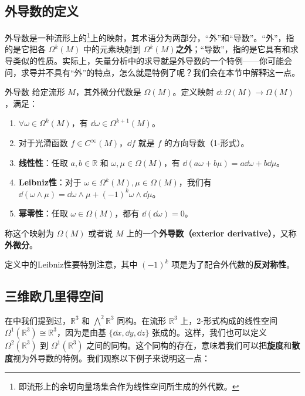

\subsection{外导数的定义}

外导数是一种流形上的\footnote{即流形上的余切向量场集合作为线性空间所生成的外代数。}上的映射，其术语分为两部分，“外”和“导数”。“外”，指的是它把各 $\Omega^k(M)$ 中的元素映射到 $\Omega^k(M)$\textbf{之外}；“导数”，指的是它具有和求导类似的性质。实际上，矢量分析中的求导就是外导数的一个特例——你可能会问，求导并不具有“外”的特点，怎么就是特例了呢？我们会在本节中解释这一点。

\begin{definition}{外导数}\label{def_ExtDer_1}
给定流形 $M$，其外微分代数是 $\Omega (M)$。定义映射 $\dd:\Omega (M)\rightarrow\Omega (M)$，满足：
\begin{enumerate}
\item $\forall \omega\in\Omega^k(M)$，有 $\dd \omega\in\Omega^{k+1}(M)$。
\item 对于光滑函数 $f\in C^\infty(M)$，$\dd f$ 就是 $f$ 的方向导数（1-形式）。
\item \textbf{线性性}：任取 $a, b\in \mathbb{R}$ 和 $\omega, \mu\in\Omega(M)$，有 $\dd(a\omega+b\mu)=a\dd\omega+b\dd\mu$。
\item \textbf{Leibniz性}：对于 $\omega\in\Omega^k(M), \mu\in\Omega(M)$，我们有 $\dd(\omega\wedge\mu)=\dd\omega\wedge\mu+(-1)^k\omega\wedge\dd\mu$。
\item \textbf{幂零性}：任取 $\omega\in\Omega(M)$，都有 $\dd(\dd\omega)=0$。
\end{enumerate}
称这个映射为 $\Omega (M)$ 或者说 $M$ 上的一个\textbf{外导数（exterior derivative）}，又称\textbf{外微分}。
\end{definition}

定义中的Leibniz性要特别注意，其中 $(-1)^k$ 项是为了配合外代数的\textbf{反对称性}。



\subsection{三维欧几里得空间}

在中我们提到过，$\mathbb{R}^3$ 和 $\bigwedge^2\mathbb{R}^3$ 同构。在流形 $\mathbb{R}^3$ 上，2-形式构成的线性空间 $\Omega^1(\mathbb{R}^3)\cong\mathbb{R}^3$，因为是由基 $\{\dd x, \dd y, \dd z\}$ 张成的。这样，我们也可以定义 $\Omega^2(\mathbb{R}^3)$ 到 $\Omega^1(\mathbb{R}^3)$ 之间的同构。这个同构的存在，意味着我们可以把\textbf{旋度}和\textbf{散度}视为外导数的特例。我们观察以下例子来说明这一点：

